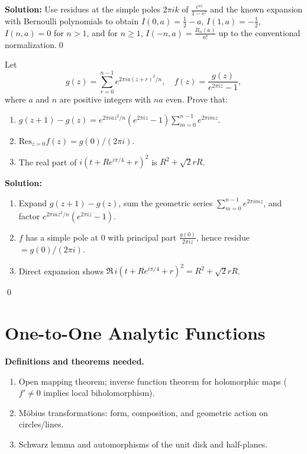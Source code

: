 \noindent\textbf{Solution:}
Use residues at the simple poles $2\pi i k$ of $\frac{e^{az}}{1-e^z}$ and the known expansion with Bernoulli polynomials to obtain $I(0,a)=\tfrac12-a$, $I(1,a)=-\tfrac12$, $I(n,a)=0$ for $n>1$, and for $n\ge1$, $I(-n,a)=\tfrac{B_n(a)}{n!}$ up to the conventional normalization.\qed


\begin{problembox}
Let
\[ g(z) = \sum_{r=0}^{n-1} e^{2\pi i a (z + r)^2 / n}, \quad f(z) = \frac{g(z)}{e^{2\pi i z} - 1}, \]
where \( a \) and \( n \) are positive integers with \( na \) even. Prove that:
\begin{enumerate}[label=(\alph*)]
\item \( g(z + 1) - g(z) = e^{2\pi i a z^2 / n} (e^{2\pi i z} - 1) \sum_{m=0}^{n-1} e^{2\pi i m z}. \)
\item \( \text{Res}_{z=0} f(z) = g(0) / (2\pi i). \)
\item The real part of \( i (t + R e^{i\pi / 4} + r)^2 \) is \( R^2 + \sqrt{2} r R \).
\end{enumerate}
\end{problembox}

\noindent\textbf{Solution:}
\begin{enumerate}[label=(\alph*)]
\item Expand $g(z+1)-g(z)$, sum the geometric series $\sum_{m=0}^{n-1}e^{2\pi i m z}$, and factor $e^{2\pi i a z^2/n}(e^{2\pi i z}-1)$.
\item $f$ has a simple pole at $0$ with principal part $\frac{g(0)}{2\pi i z}$, hence residue $=g(0)/(2\pi i)$.
\item Direct expansion shows $\Re\,i(t+Re^{i\pi/4}+r)^2=R^2+\sqrt2 rR$.
\end{enumerate}\qed
\section{One-to-One Analytic Functions}

\noindent\textbf{Definitions and theorems needed.}
\begin{enumerate}[label=(\alph*)]
\item Open mapping theorem; inverse function theorem for holomorphic maps ($f'\ne0$ implies local biholomorphism).
\item Möbius transformations: form, composition, and geometric action on circles/lines.
\item Schwarz lemma and automorphisms of the unit disk and half-planes.
\end{enumerate}



